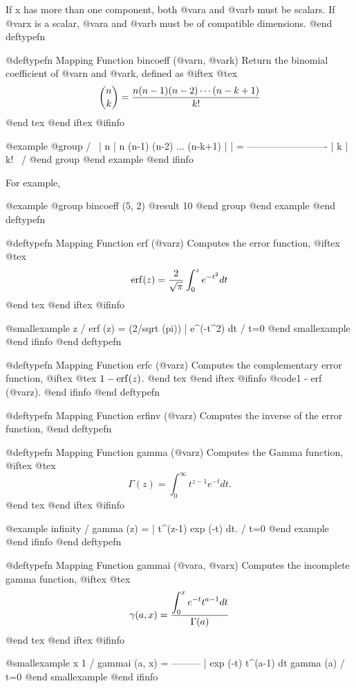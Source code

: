 If x has more than one component, both @var{a} and @var{b} must be
scalars.  If @var{x} is a scalar, @var{a} and @var{b} must be of
compatible dimensions.
@end deftypefn

@deftypefn {Mapping Function} {} bincoeff (@var{n}, @var{k})
Return the binomial coefficient of @var{n} and @var{k}, defined as
@iftex
@tex
$$
 {n \choose k} = {n (n-1) (n-2) \cdots (n-k+1) \over k!}
$$
@end tex
@end iftex
@ifinfo

@example
@group
 /   \
 | n |    n (n-1) (n-2) ... (n-k+1)
 |   |  = -------------------------
 | k |               k!
 \   /
@end group
@end example
@end ifinfo

For example,

@example
@group
bincoeff (5, 2)
     @result{} 10
@end group
@end example
@end deftypefn

@deftypefn {Mapping Function} {} erf (@var{z})
Computes the error function,
@iftex
@tex
$$
 {\rm erf} (z) = {2 \over \sqrt{\pi}}\int_0^z e^{-t^2} dt
$$
@end tex
@end iftex
@ifinfo

@smallexample
                         z
                        /
erf (z) = (2/sqrt (pi)) | e^(-t^2) dt
                        /
                     t=0
@end smallexample
@end ifinfo
@end deftypefn

@deftypefn {Mapping Function} {} erfc (@var{z})
Computes the complementary error function,
@iftex
@tex
$1 - {\rm erf} (z)$.
@end tex
@end iftex
@ifinfo
@code{1 - erf (@var{z})}.
@end ifinfo
@end deftypefn

@deftypefn {Mapping Function} {} erfinv (@var{z})
Computes the inverse of the error function,
@end deftypefn

@deftypefn {Mapping Function} {} gamma (@var{z})
Computes the Gamma function,
@iftex
@tex
$$
 \Gamma (z) = \int_0^\infty t^{z-1} e^{-t} dt.
$$
@end tex
@end iftex
@ifinfo

@example
            infinity
            /
gamma (z) = | t^(z-1) exp (-t) dt.
            /
         t=0
@end example
@end ifinfo
@end deftypefn

@deftypefn {Mapping Function} {} gammai (@var{a}, @var{x})
Computes the incomplete gamma function,
@iftex
@tex
$$
 \gamma (a, x) = {\displaystyle\int_0^x e^{-t} t^{a-1} dt \over \Gamma (a)}
$$
@end tex
@end iftex
@ifinfo

@smallexample
                              x
                    1        /
gammai (a, x) = ---------    | exp (-t) t^(a-1) dt
                gamma (a)    /
                          t=0
@end smallexample
@end ifinfo

